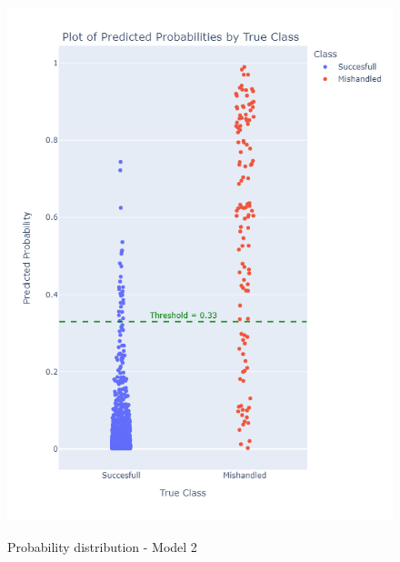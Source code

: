 \documentclass[12pt]{article}
\begin{document}
\begin{figure}
\begin{minipage}[c]{0.4\linewidth}
    \includegraphics[width=1\textwidth]{Probability_distribution_Model 2.png}\\
    \caption{Probability distribution - Model 2}
\end{minipage}%
\end{figure}
\end{document}
